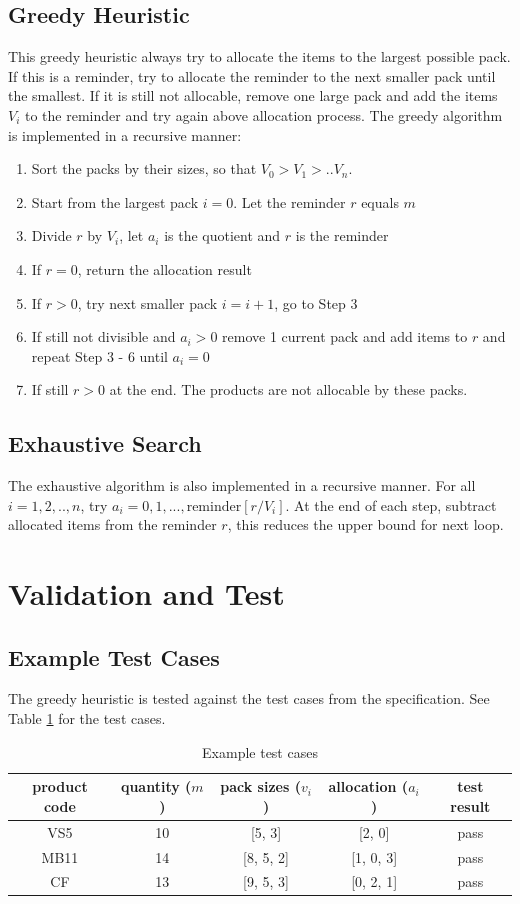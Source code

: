 \documentclass[a4paper]{article}
\begin{document}
\subsection{Greedy Heuristic}
This greedy heuristic always try to allocate the items to the largest possible pack. If this is a reminder, try to allocate the reminder to the next smaller pack until the smallest. If it is still not allocable, remove one large pack and add the items $V_i$ to the reminder and try again above allocation process. The greedy algorithm is implemented in a recursive manner:
\begin{enumerate}
\item Sort the packs by their sizes, so that $V_0 > V_1 > .. V_n$.
\item Start from the largest pack $i=0$. Let the reminder $r$ equals $m$
\item Divide $r$ by $V_i$, let $a_i$ is the quotient and $r$ is the reminder
\item If $r = 0$, return the allocation result
\item If $r > 0$, try next smaller pack $i = i + 1$, go to Step 3
\item If still not divisible and $a_i>0$ remove 1 current pack and add items to $r$ and repeat Step 3 - 6 until $a_i = 0$
\item If still $r>0$ at the end. The products are not allocable by these packs.
\end{enumerate}


\subsection{Exhaustive Search}
The exhaustive algorithm is also implemented in a recursive manner. For all $i=1, 2, .., n$, try $a_i = 0, 1, ...,\mathrm{reminder}[r/V_i]$. At the end of each step, subtract allocated items from the reminder $r$, this reduces the upper bound for next loop.

\section{Validation and Test} 
 
\subsection{Example Test Cases}
The greedy heuristic is tested against the test cases from the specification. See Table {\ref{tab:example-test}} for the test cases.
\begin{table}
\label{tab:example-test}
 \caption{Example test cases}
 \centering
 \begin{tabular}{| c | c | c | c | c |}
 \hline
        product code & quantity ($m$) & pack sizes ($v_i$) & allocation ($a_i$) & test result\\
 \hline
 		VS5 & 10 & [5, 3] & [2, 0] & pass \\
 		MB11 & 14 & [8, 5, 2] & [1, 0, 3] & pass\\
 		CF & 13 & [9, 5, 3] & [0, 2, 1] & pass\\
  \hline
 \end{tabular}
\end{table}
\end{document}
